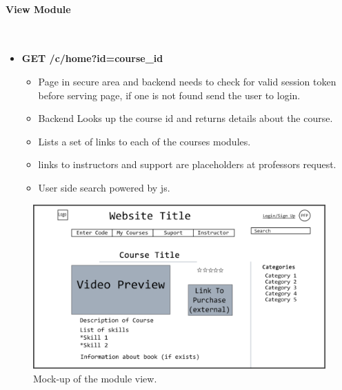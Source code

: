 \documentclass{article}
\begin{document}
\paragraph{View Module}\\
\begin{itemize}
    \item \textbf{GET /c/home?id=course\_id}
        \begin{itemize}
        \item Page in secure area and backend needs to check for valid session
            token before serving page, if one is not found send the user to
                login.
        \item Backend Looks up the course id and returns details about the course.
        \item Lists a set of links to each of the courses modules.
        \item links to instructors and support are placeholders at professors request.
        \item User side search powered by js.
    \end{itemize}
\end{itemize}
\begin{figure}[h!]
    \caption{Mock-up of the module view.}
    \includegraphics[width=\textwidth]{course_preview}
\end{figure}

\newpage
\end{document}

